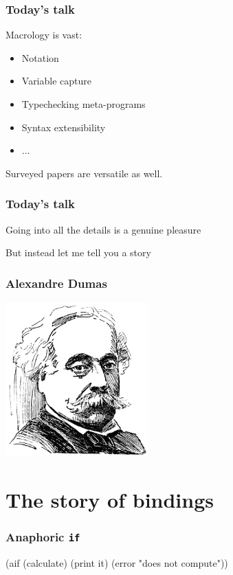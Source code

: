 \documentclass[hyperref={bookmarks=false}]{beamer}
\begin{document}
\begin{frame}[fragile]
\frametitle{Today's talk}

Macrology is vast:
\begin{itemize}
\item Notation
\item Variable capture
\item Typechecking meta-programs
\item Syntax extensibility
\item ...
\end{itemize}

\pause
Surveyed papers are versatile as well.
\end{frame}

\begin{frame}[fragile]
\frametitle{Today's talk}

Going into all the details is a genuine pleasure

But instead let me tell you a story
\end{frame}

\begin{frame}[fragile]
\frametitle{Alexandre Dumas}

\begin{center}
\includegraphics[width=5.5cm]{dumas}
\end{center}
\end{frame}

\section{The story of bindings}

\begin{frame}[fragile]
\frametitle{Anaphoric \texttt{if}}
\begin{semiverbatim}
(aif (calculate)
  (print it)
  (error "does not compute"))
\end{semiverbatim}
\end{frame}
\end{document}
